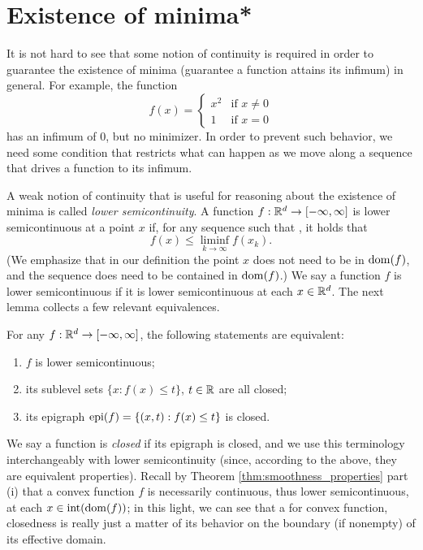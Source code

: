 \section{Existence of minima*}
\label{sec:existence_minima}

It is not hard to see that some notion of continuity is required in order to
guarantee the existence of minima (guarantee a function attains its infimum) in
general. For example, the function
\begin{equation}
\label{eq:discontinuous_quadratic}
f(x) = \begin{cases}
x^2 & \text{if $x \not= 0$} \\
1 & \text{if $x = 0$}
\end{cases}
\end{equation}
has an infimum of 0, but no minimizer. In order to prevent such behavior, we
need some condition that restricts what can happen as we move along a sequence
that drives a function to its infimum.  

A weak notion of continuity that is useful for reasoning about the existence  
of minima is called \emph{lower semicontinuity}. A function $f : \mathbb{R}^d \to 
[-\infty, \infty]$ is lower semicontinuous at a point $x$ if, for any sequence 
such that , it holds that 
\[
f(x) \leq \liminf_{k \to \infty} f(x_k). 
\]
(We emphasize that in our definition the point $x$ does not need to be in
$\operatorname{dom}(f)$, and the sequence  does need to be
contained in $\operatorname{dom}(f)$.)  We say a function $f$ is lower semicontinuous if it 
is lower semicontinuous at each $x \in \mathbb{R}^d$. The next lemma collects a few 
relevant equivalences.

\begin{Lemma}
\label{lem:lower_semicontinuous}
For any $f : \mathbb{R}^d \to [-\infty, \infty]$, the following statements are equivalent:
\begin{enumerate}[label=(\roman*)]
\item $f$ is lower semicontinuous;
\item its sublevel sets $\{x : f(x) \leq t\}$, $t \in \mathbb{R}$ are all closed;
\item its epigraph $\operatorname{epi}(f) = \{(x,t) : f(x) \leq t\}$ is closed. 
\end{enumerate}
\end{Lemma}

We say a function is \emph{closed} if its epigraph is closed, and we use this
terminology interchangeably with lower semicontinuity (since, according to the
above, they are equivalent properties). Recall by Theorem
\ref{thm:smoothness_properties} part (i) that a convex function $f$ is
necessarily continuous, thus lower semicontinuous, at each $x \in
\operatorname{int}(\operatorname{dom}(f))$; in this light, we can see that a for convex function,
closedness is really just a matter of its behavior on the boundary (if nonempty)
of its effective domain.

